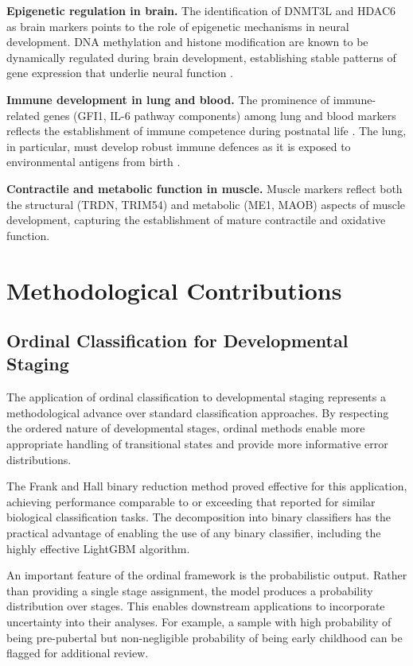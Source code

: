 \textbf{Epigenetic regulation in brain.} The identification of DNMT3L and HDAC6 as brain markers points to the role of epigenetic mechanisms in neural development. DNA methylation and histone modification are known to be dynamically regulated during brain development, establishing stable patterns of gene expression that underlie neural function \parencite{pena_epigenetic_2026}.

\textbf{Immune development in lung and blood.} The prominence of immune-related genes (GFI1, IL-6 pathway components) among lung and blood markers reflects the establishment of immune competence during postnatal life \parencite{georgountzou_postnatal_2017}. The lung, in particular, must develop robust immune defences as it is exposed to environmental antigens from birth \parencite{mair_porcine_2014}.

\textbf{Contractile and metabolic function in muscle.} Muscle markers reflect both the structural (TRDN, TRIM54) and metabolic (ME1, MAOB) aspects of muscle development, capturing the establishment of mature contractile and oxidative function.


\section{Methodological Contributions}\label{sec:discussion:methods}

\subsection{Ordinal Classification for Developmental Staging}

The application of ordinal classification to developmental staging represents a methodological advance over standard classification approaches. By respecting the ordered nature of developmental stages, ordinal methods enable more appropriate handling of transitional states and provide more informative error distributions.

The Frank and Hall binary reduction method \parencite{frank_simple_2001} proved effective for this application, achieving performance comparable to or exceeding that reported for similar biological classification tasks. The decomposition into binary classifiers has the practical advantage of enabling the use of any binary classifier, including the highly effective LightGBM algorithm.

An important feature of the ordinal framework is the probabilistic output. Rather than providing a single stage assignment, the model produces a probability distribution over stages. This enables downstream applications to incorporate uncertainty into their analyses. For example, a sample with high probability of being pre-pubertal but non-negligible probability of being early childhood can be flagged for additional review.

